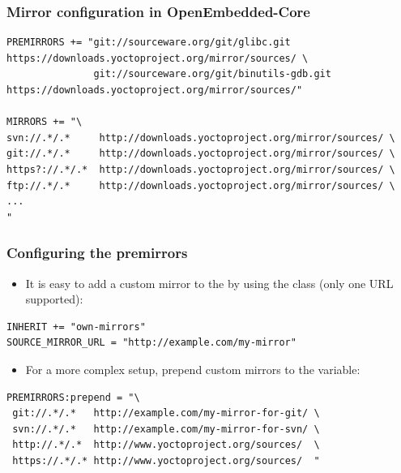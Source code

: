 \begin{frame}[fragile]
  \frametitle{Mirror configuration in OpenEmbedded-Core}
  \begin{block}{}
    \begin{verbatim}
PREMIRRORS += "git://sourceware.org/git/glibc.git        https://downloads.yoctoproject.org/mirror/sources/ \
               git://sourceware.org/git/binutils-gdb.git https://downloads.yoctoproject.org/mirror/sources/"

MIRRORS += "\
svn://.*/.*     http://downloads.yoctoproject.org/mirror/sources/ \
git://.*/.*     http://downloads.yoctoproject.org/mirror/sources/ \
https?://.*/.*  http://downloads.yoctoproject.org/mirror/sources/ \
ftp://.*/.*     http://downloads.yoctoproject.org/mirror/sources/ \
...
"
    \end{verbatim}
  \end{block}
\end{frame}

\begin{frame}[fragile]
  \frametitle{Configuring the premirrors}
  \begin{itemize}
    \item It is easy to add a custom mirror to the  by
      using the  class (only one URL supported):
  \end{itemize}
  \begin{block}{}
    \begin{verbatim}
INHERIT += "own-mirrors"
SOURCE_MIRROR_URL = "http://example.com/my-mirror"
    \end{verbatim}
  \end{block}
  \begin{itemize}
    \item For a more complex setup,  prepend custom mirrors to the
       variable:
  \end{itemize}
  \begin{block}{}
    \begin{verbatim}
PREMIRRORS:prepend = "\
 git://.*/.*   http://example.com/my-mirror-for-git/ \
 svn://.*/.*   http://example.com/my-mirror-for-svn/ \
 http://.*/.*  http://www.yoctoproject.org/sources/  \
 https://.*/.* http://www.yoctoproject.org/sources/  "
    \end{verbatim}
  \end{block}
\end{frame}

